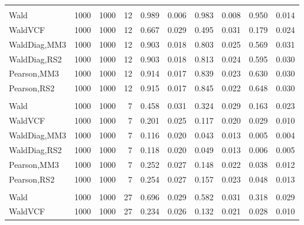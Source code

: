 \documentclass[
]{article}
\begin{document}
\begin{table}[H]
{\begin{tabular}[t]{lrrrrrrlrr}
\addlinespace[0.3em]
\multicolumn{10}{l}{\textbf{1F 15V}}\\
\hspace{1em}Wald & 1000 & 1000 & 12 & 0.989 & 0.006 & 0.983 & 0.008 & 0.950 & 0.014\\
\hspace{1em}WaldVCF & 1000 & 1000 & 12 & 0.667 & 0.029 & 0.495 & 0.031 & 0.179 & 0.024\\
\hspace{1em}WaldDiag,MM3 & 1000 & 1000 & 12 & 0.903 & 0.018 & 0.803 & 0.025 & 0.569 & 0.031\\
\hspace{1em}WaldDiag,RS2 & 1000 & 1000 & 12 & 0.903 & 0.018 & 0.813 & 0.024 & 0.595 & 0.030\\
\hspace{1em}Pearson,MM3 & 1000 & 1000 & 12 & 0.914 & 0.017 & 0.839 & 0.023 & 0.630 & 0.030\\
\hspace{1em}Pearson,RS2 & 1000 & 1000 & 12 & 0.915 & 0.017 & 0.845 & 0.022 & 0.648 & 0.030\\
\addlinespace[0.3em]
\multicolumn{10}{l}{\textbf{2F 10V}}\\
\hspace{1em}Wald & 1000 & 1000 & 7 & 0.458 & 0.031 & 0.324 & 0.029 & 0.163 & 0.023\\
\hspace{1em}WaldVCF & 1000 & 1000 & 7 & 0.201 & 0.025 & 0.117 & 0.020 & 0.029 & 0.010\\
\hspace{1em}WaldDiag,MM3 & 1000 & 1000 & 7 & 0.116 & 0.020 & 0.043 & 0.013 & 0.005 & 0.004\\
\hspace{1em}WaldDiag,RS2 & 1000 & 1000 & 7 & 0.118 & 0.020 & 0.049 & 0.013 & 0.006 & 0.005\\
\hspace{1em}Pearson,MM3 & 1000 & 1000 & 7 & 0.252 & 0.027 & 0.148 & 0.022 & 0.038 & 0.012\\
\hspace{1em}Pearson,RS2 & 1000 & 1000 & 7 & 0.254 & 0.027 & 0.157 & 0.023 & 0.048 & 0.013\\
\addlinespace[0.3em]
\multicolumn{10}{l}{\textbf{3F 15V}}\\
\hspace{1em}Wald & 1000 & 1000 & 27 & 0.696 & 0.029 & 0.582 & 0.031 & 0.318 & 0.029\\
\hspace{1em}WaldVCF & 1000 & 1000 & 27 & 0.234 & 0.026 & 0.132 & 0.021 & 0.028 & 0.010\\

\end{tabular}}
\end{table}
\end{document}
